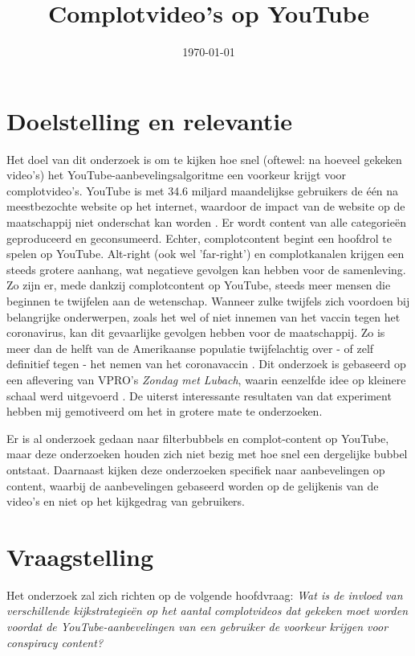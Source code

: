 \documentclass{uva-inf-article}
\title{Complotvideo's op YouTube}
\date{\today}
\begin{document}
\maketitle
\setlength{\parindent}{12ex}
\linenumbers

\section{Doelstelling en relevantie}
Het doel van dit onderzoek is om te kijken hoe snel (oftewel: na hoeveel gekeken video’s) het YouTube-aanbevelingsalgoritme een voorkeur krijgt voor complotvideo's. YouTube is met 34.6 miljard maandelijkse gebruikers de één na meestbezochte website op het internet, waardoor de impact van de website op de maatschappij niet onderschat kan worden \citep{neufeld_2021}. Er wordt content van alle categorieën geproduceerd en geconsumeerd. Echter, complotcontent begint een hoofdrol te spelen op YouTube. Alt-right (ook wel 'far-right') en complotkanalen krijgen een steeds grotere aanhang, wat negatieve gevolgen kan hebben voor de samenleving. Zo zijn er, mede dankzij complotcontent op YouTube, steeds meer mensen die beginnen te twijfelen aan de wetenschap. Wanneer zulke twijfels zich voordoen bij belangrijke onderwerpen, zoals het wel of niet innemen van het vaccin tegen het coronavirus, kan dit gevaarlijke gevolgen hebben voor de maatschappij. Zo is meer dan de helft van de Amerikaanse populatie twijfelachtig over - of zelf definitief tegen - het nemen van het coronavaccin \citep{rosenbaum2021escaping}. Dit onderzoek is gebaseerd op een aflevering van VPRO's \textit{Zondag met Lubach}, waarin eenzelfde idee op kleinere schaal werd uitgevoerd \citep{lubach_2020}. De uiterst interessante resultaten van dat experiment hebben mij gemotiveerd om het in grotere mate te onderzoeken. 

Er is al onderzoek gedaan naar filterbubbels en complot-content op YouTube, maar deze onderzoeken houden zich niet bezig met hoe snel een dergelijke bubbel ontstaat. Daarnaast kijken deze onderzoeken specifiek naar aanbevelingen op content, waarbij de aanbevelingen gebaseerd worden op de gelijkenis van de video’s en niet op het kijkgedrag van gebruikers. 

\section{Vraagstelling}
Het onderzoek zal zich richten op de volgende hoofdvraag:
\textit{Wat is de invloed van verschillende kijkstrategieën op het aantal complotvideos dat gekeken moet worden voordat de YouTube-aanbevelingen van een gebruiker de voorkeur krijgen voor conspiracy content?}
\end{document}

